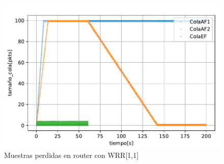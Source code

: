 \begin{figure}[!ht]
    \centering
    \includegraphics{graficas/WRR/tamao_cola_wrr.pdf}
    \caption{Muestras perdidas en router con WRR[1,1]}
    \label{fig:wrr16_lostsamples}
\end{figure}
